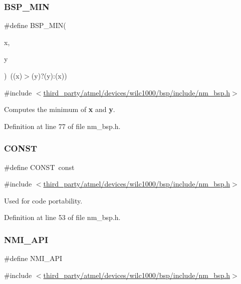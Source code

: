 \subsubsection{\texorpdfstring{B\+S\+P\+\_\+\+M\+IN}{BSP\_MIN}}
{\footnotesize\ttfamily \#define B\+S\+P\+\_\+\+M\+IN(\begin{DoxyParamCaption}\item[{}]{x,  }\item[{}]{y }\end{DoxyParamCaption})~((x)$>$(y)?(y)\+:(x))}



{\ttfamily \#include $<$\hyperlink{nm__bsp_8h}{third\+\_\+party/atmel/devices/wilc1000/bsp/include/nm\+\_\+bsp.\+h}$>$}

Computes the minimum of {\bfseries x} and {\bfseries y}. 

Definition at line 77 of file nm\+\_\+bsp.\+h.

\mbox{\label{group__BSPDefine_ga0c33b494a68ce28497e7ce8e5e95feff}} 
\subsubsection{\texorpdfstring{C\+O\+N\+ST}{CONST}}
{\footnotesize\ttfamily \#define C\+O\+N\+ST~const}



{\ttfamily \#include $<$\hyperlink{nm__bsp_8h}{third\+\_\+party/atmel/devices/wilc1000/bsp/include/nm\+\_\+bsp.\+h}$>$}

Used for code portability. 

Definition at line 53 of file nm\+\_\+bsp.\+h.

\mbox{\label{group__BSPDefine_gaecc0323d771e41ef81a76b5f12783e22}} 
\subsubsection{\texorpdfstring{N\+M\+I\+\_\+\+A\+PI}{NMI\_API}}
{\footnotesize\ttfamily \#define N\+M\+I\+\_\+\+A\+PI}



{\ttfamily \#include $<$\hyperlink{nm__bsp_8h}{third\+\_\+party/atmel/devices/wilc1000/bsp/include/nm\+\_\+bsp.\+h}$>$}

